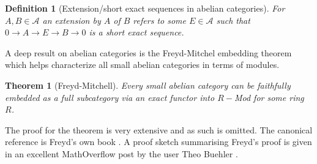 \documentclass[12pt]{report}
\numberwithin{equation}{section}
\newtheorem{theorem}[dummy]{Theorem}
\newtheorem{definition}[dummy]{Definition}
\begin{document}
	\begin{definition}[Extension/short exact sequences in abelian categories]
		For $ A, B \in \mathcal{A}$ an extension by $A$ of $B$ refers to some $E \in \mathcal{A}$ such that $0 \to A \to E \to B \to 0$ is a short exact sequence.
	\end{definition}
	


	
	A deep result on abelian categories is the Freyd-Mitchel embedding theorem which helps characterize all small abelian categories in terms of modules.
	
	\begin{theorem}[Freyd-Mitchell]
		Every small abelian category can be faithfully embedded as a full subcategory via an exact functor into $R-$Mod for some ring $R$.
	\end{theorem}
	The proof for the theorem is very extensive and as such is omitted. The canonical reference is Freyd's own book \cite{freyd1964abelian}. A proof sketch summarising Freyd's proof is given in an excellent MathOverflow post by the user Theo Buehler \cite{47762}.
	
\end{document}
